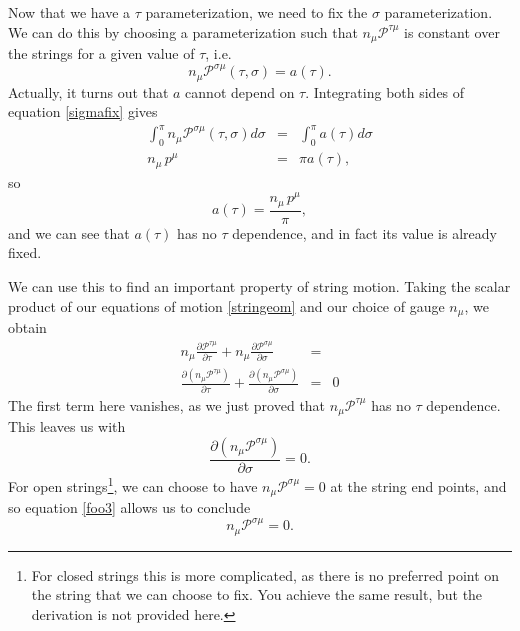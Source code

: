 \documentclass[a4paper,12pt]{article}
\numberwithin{equation}{section}
\begin{document}
Now that we have a $\tau$ parameterization, we need to fix the $\sigma$ parameterization. We can do this by choosing a parameterization such that $n_\mu\mathcal{P}^{\tau \mu}$ is constant over the strings for a given value of $\tau$, i.e.
\begin{equation}\label{sigmafix}
n_\mu \mathcal{P}^{\sigma \mu}(\tau, \sigma) = a(\tau).
\end{equation}
Actually, it turns out that $a$ cannot depend on $\tau$. Integrating both sides of equation \ref{sigmafix} gives 
\begin{eqnarray*}
\int_0^\pi n_\mu \mathcal{P}^{\sigma \mu}(\tau, \sigma) d\sigma & = & \int_0^\pi a(\tau) d\sigma\\
n_\mu\, p^\mu &= &\pi a(\tau),
\end{eqnarray*}
so
\begin{equation}\label{ndotp}
a(\tau) = \frac{n_\mu\,p^\mu}{\pi}, 
\end{equation}
and we can see that $a(\tau)$ has no $\tau$ dependence, and in fact its value is already fixed.

We can use this to find an important property of string motion. Taking the scalar product of our equations of motion \ref{stringeom} and our choice of gauge $n_\mu$, we obtain
\begin{eqnarray*}
n_\mu\frac{\partial \mathcal{P}^{\tau \mu}}{\partial \tau} + n_\mu\frac{\partial \mathcal{P}^{\sigma \mu}}{\partial \sigma} & = &\\
\frac{\partial (n_\mu \mathcal{P}^{\tau \mu})}{\partial \tau} + \frac{\partial(n_\mu \mathcal{P}^{\sigma \mu})}{\partial \sigma} & = & 0
\end{eqnarray*}
The first term here vanishes, as we just proved that $n_\mu \mathcal{P}^{\tau \mu}$ has no $\tau$ dependence. This leaves us with
\begin{equation}\label{foo3}
\frac{\partial (n_\mu \mathcal{P}^{\sigma \mu})}{\partial \sigma} = 0. 
\end{equation}
For open strings\footnote{For closed strings this is more complicated, as there is no preferred point on the string that we can choose to fix. You achieve the same result, but the derivation is not provided here.}, we can choose to have $n_\mu \mathcal{P}^{\sigma \mu} = 0$ at the string end points, and so equation \ref{foo3} allows us to conclude
\begin{equation}
n_\mu \mathcal{P}^{\sigma \mu} = 0.
\end{equation}
\end{document}

